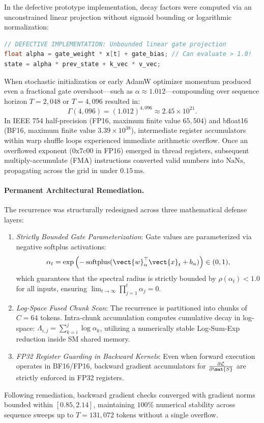 In the defective prototype implementation, decay factors were computed via an unconstrained linear projection without sigmoid bounding or logarithmic normalization:
\begin{lstlisting}[language=C++]
// DEFECTIVE IMPLEMENTATION: Unbounded linear gate projection
float alpha = gate_weight * x[t] + gate_bias; // Can evaluate > 1.0!
state = alpha * prev_state + k_vec * v_vec;
\end{lstlisting}
When stochastic initialization or early AdamW optimizer momentum produced even a fractional gate overshoot—such as $\alpha \approx 1.012$—compounding over sequence horizon $T = 2{,}048$ or $T = 4{,}096$ resulted in:
\begin{equation}
\Gamma(4{,}096) = (1.012)^{4{,}096} \approx 2.45 \times 10^{21}.
\end{equation}
In IEEE 754 half-precision (FP16, maximum finite value $65{,}504$) and bfloat16 (BF16, maximum finite value $3.39 \times 10^{38}$), intermediate register accumulators within warp shuffle loops experienced immediate arithmetic overflow. Once an overflowed exponent ($\text{0x7c00}$ in FP16) emerged in thread registers, subsequent multiply-accumulate (FMA) instructions converted valid numbers into $\text{NaNs}$, propagating across the grid in under $0.15\,\text{ms}$.

\paragraph{Permanent Architectural Remediation.}
The recurrence was structurally redesigned across three mathematical defense layers:
\begin{enumerate}
    \item \emph{Strictly Bounded Gate Parameterization}: Gate values are parameterized via negative softplus activations:
    \begin{equation}
    \alpha_t = \exp\left( -\operatorname{softplus}(\vect{w}_\alpha^\top \vect{x}_t + b_\alpha) \right) \in (0, 1),
    \end{equation}
    which guarantees that the spectral radius is strictly bounded by $\rho(\alpha_t) < 1.0$ for all inputs, ensuring $\lim_{t \to \infty} \prod_{j=1}^t \alpha_j = 0$.
    \item \emph{Log-Space Fused Chunk Scan}: The recurrence is partitioned into chunks of $C=64$ tokens. Intra-chunk accumulation computes cumulative decay in log-space: $\Lambda_{i,j} = \sum_{k=i}^j \log \alpha_k$, utilizing a numerically stable Log-Sum-Exp reduction inside SM shared memory.
    \item \emph{FP32 Register Guarding in Backward Kernels}: Even when forward execution operates in BF16/FP16, backward gradient accumulators for $\frac{\partial \mathcal{L}}{\partial \mat{S}}$ are strictly enforced in FP32 registers.
\end{enumerate}
Following remediation, backward gradient checks converged with gradient norms bounded within $[0.85, 2.14]$, maintaining $100\%$ numerical stability across sequence sweeps up to $T = 131{,}072$ tokens without a single overflow.

